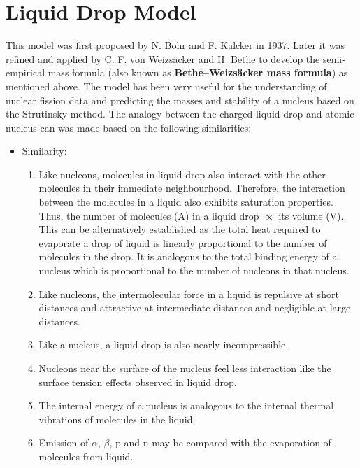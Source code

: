 \documentclass[ebook,12pt,oneside,openany]{memoir}
\begin{document}
    \section{Liquid Drop Model}
    This model was first proposed by N. Bohr and F. Kalcker in 1937. Later it was refined and applied by C. F. von Weizsäcker and H. Bethe to develop the semi-empirical mass formula (also known as \textbf{Bethe–Weizsäcker mass formula}) as mentioned above.  The model has been very useful for the understanding of nuclear fission data and predicting the masses and stability of a nucleus based on the Strutinsky method. The analogy between the charged liquid drop and atomic nucleus can was made based on the following similarities:
    
        \begin{itemize}
        
            \item Similarity:
            
                \begin{enumerate}
                    \item Like nucleons, molecules in liquid drop also interact with the other molecules in their immediate neighbourhood. Therefore, the interaction between the molecules in a liquid also exhibits saturation properties. Thus, the number of molecules (A) in a liquid drop $\propto$ its volume (V). This can be alternatively established as the total heat required to evaporate a drop of liquid is linearly proportional to the number of molecules in the drop. It is analogous to the total binding energy of a nucleus which is proportional to the number of nucleons in that nucleus.
                    \item Like nucleons, the intermolecular force in a liquid is repulsive at short distances and attractive at intermediate distances and negligible at large distances.
                    \item Like a nucleus, a liquid drop is also nearly incompressible.
                    \item Nucleons near the surface of the nucleus feel less interaction like the surface tension effects observed in liquid drop.
                    \item The internal energy of a nucleus is analogous to the internal thermal vibrations of molecules in the liquid.
                    \item Emission of $\alpha$, $\beta$, p and n may be compared with the evaporation of molecules from liquid.
                \end{enumerate}
            

\end{itemize}
\end{document}
